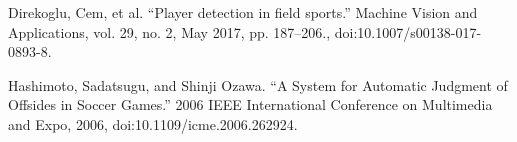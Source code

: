 \documentclass[letterpaper, 10 pt, conference]{ieeeconf}  %
\begin{document}
\addtolength{\textheight}{-12cm}   %


\begin{thebibliography}{99}

 Direkoglu, Cem, et al. “Player detection in field sports.” Machine Vision and 
Applications, vol. 29, no. 2, May 2017, pp. 187–206., doi:10.1007/s00138-017-0893-8.

Hashimoto, Sadatsugu, and Shinji Ozawa. “A System for Automatic Judgment of 
Offsides in Soccer Games.” 2006 IEEE International Conference on Multimedia and Expo, 2006, doi:10.1109/icme.2006.262924.


\end{thebibliography}
\end{document}
